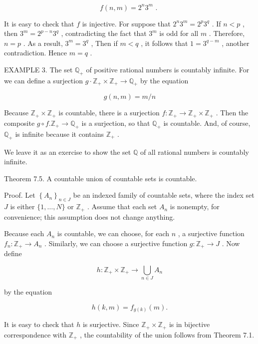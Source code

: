 \documentclass[10pt]{article}
\begin{document}
\[
f\left( {n,m}\right)  = {2}^{n}{3}^{m}\text{ . }
\]

It is easy to check that \(f\) is injective. For suppose that \({2}^{n}{3}^{m} = {2}^{p}{3}^{q}\) . If \(n < p\) , then \({3}^{m} = {2}^{p - n}{3}^{q}\) , contradicting the fact that \({3}^{m}\) is odd for all \(m\) . Therefore, \(n = p\) . As a result, \({3}^{m} = {3}^{q}\) , Then if \(m < q\) , it follows that \(1 = {3}^{q - m}\) , another contradiction. Hence \(m = q\) .

EXAMPLE 3. The set \({\mathbb{Q}}_{ + }\) of positive rational numbers is countably infinite. For we can define a surjection \(g \cdot  {\mathbb{Z}}_{ + } \times  {\mathbb{Z}}_{ + } \rightarrow  {\mathbb{Q}}_{ + }\) by the equation

\[
g\left( {n,m}\right)  = m/n
\]

Because \({\mathbb{Z}}_{ + } \times  {\mathbb{Z}}_{ + }\) is countable, there is a surjection \(f : {\mathbb{Z}}_{ + } \rightarrow  {\mathbb{Z}}_{ + } \times  {\mathbb{Z}}_{ + }\) . Then the composite \(g \circ  f.{\mathbb{Z}}_{ + } \rightarrow  {\mathbb{Q}}_{ + }\) is a surjection, so that \({\mathbb{Q}}_{ + }\) is countable. And, of course, \({\mathbb{Q}}_{ + }\) is infinite because it contains \({\mathbb{Z}}_{ + }\) .

We leave it as an exercise to show the set \(\mathbb{Q}\) of all rational numbers is countably infinite.

Theorem 7.5. A countable union of countable sets is countable.

Proof. Let \({\left\{  {A}_{n}\right\}  }_{n \in  J}\) be an indexed family of countable sets, where the index set \(J\) is either \(\{ 1,\ldots ,N\}\) or \({\mathbb{Z}}_{ + }\) . Assume that each set \({A}_{n}\) is nonempty, for convenience; this assumption does not change anything.

Because each \({A}_{n}\) is countable, we can choose, for each \(n\) , a surjective function \({f}_{n} : {\mathbb{Z}}_{ + } \rightarrow  {A}_{n}\) . Similarly, we can choose a surjective function \(g : {\mathbb{Z}}_{ + } \rightarrow  J\) . Now define

\[
h : {\mathbb{Z}}_{ + } \times  {\mathbb{Z}}_{ + } \rightarrow  \mathop{\bigcup }\limits_{{n \in  J}}{A}_{n}
\]

by the equation

\[
h\left( {k,m}\right)  = {f}_{g\left( k\right) }\left( m\right) .
\]

It is easy to check that \(h\) is surjective. Since \({\mathbb{Z}}_{ + } \times  {\mathbb{Z}}_{ + }\) is in bijective correspondence with \({\mathbb{Z}}_{ + }\) , the countability of the union follows from Theorem 7.1.
\end{document}
